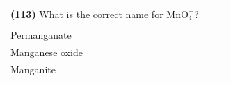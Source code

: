 \documentclass{article}
\begin{document}
\vspace{0.2cm}
\noindent
\begin{tabular}{|p{0.9\linewidth}|}
\hline
\vspace{0.2cm}
\textbf{(113)} What is the correct name for $\text{MnO}_4^{-}$? \\
\begin{minipage}[t]{0.85\linewidth}
\begin{enumerate}[label=\alph*.]
\item Manganate \\
\item Permanganate \\
\item Manganese oxide \\
\item Manganite
\end{enumerate}
\end{minipage}\\
\hline
\end{tabular}
\end{document}
